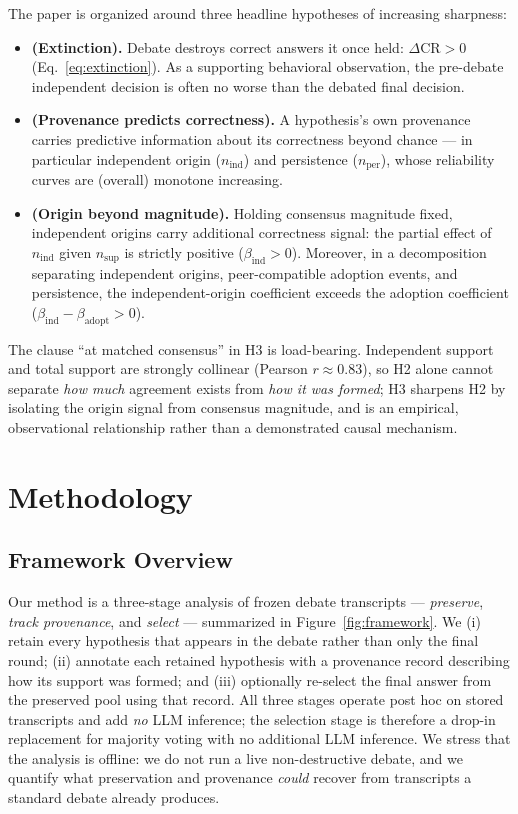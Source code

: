 The paper is organized around three headline hypotheses of increasing sharpness:
\begin{itemize}
    \item[\textbf{H1}] \textbf{(Extinction).} Debate destroys correct answers it once held:
    $\Delta\mathrm{CR}>0$ (Eq.~\ref{eq:extinction}). As a supporting behavioral observation, the pre-debate
    independent decision is often no worse than the debated final decision.
    \item[\textbf{H2}] \textbf{(Provenance predicts correctness).} A hypothesis's own provenance carries
    predictive information about its correctness beyond chance --- in particular independent origin
    ($n_{\mathrm{ind}}$) and persistence ($n_{\mathrm{per}}$), whose reliability curves are (overall)
    monotone increasing.
    \item[\textbf{H3}] \textbf{(Origin beyond magnitude).} Holding consensus magnitude fixed, independent
    origins carry additional correctness signal: the partial effect of $n_{\mathrm{ind}}$ given
    $n_{\mathrm{sup}}$ is strictly positive ($\beta_{\mathrm{ind}}>0$). Moreover, in a decomposition
    separating independent origins, peer-compatible adoption events, and persistence, the independent-origin
    coefficient exceeds the adoption coefficient ($\beta_{\mathrm{ind}}-\beta_{\mathrm{adopt}}>0$).
\end{itemize}
The clause ``at matched consensus'' in H3 is load-bearing. Independent support and total support are
strongly collinear (Pearson $r\approx0.83$), so H2 alone cannot separate \emph{how much} agreement exists
from \emph{how it was formed}; H3 sharpens H2 by isolating the origin signal from consensus magnitude, and
is an empirical, observational relationship rather than a demonstrated causal mechanism.


\section{Methodology}
\label{sec:methodology}

\subsection{Framework Overview}
\label{subsec:framework_overview}

Our method is a three-stage analysis of frozen debate transcripts --- \emph{preserve}, \emph{track
provenance}, and \emph{select} --- summarized in Figure~\ref{fig:framework}. We (i) retain every
hypothesis that appears in the debate rather than only the final round; (ii) annotate each retained
hypothesis with a provenance record describing how its support was formed; and (iii) optionally re-select
the final answer from the preserved pool using that record. All three stages operate post hoc on stored
transcripts and add \emph{no} LLM inference; the selection stage is therefore a drop-in replacement for
majority voting with no additional LLM inference. We stress that the analysis is offline: we do not run a live
non-destructive debate, and we quantify what preservation and provenance \emph{could} recover from
transcripts a standard debate already produces.

